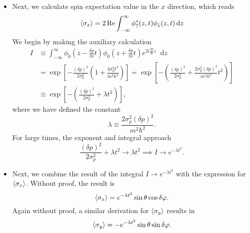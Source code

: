 \documentclass[11pt, a4paper]{article}
\newcommand{\diff}{\mathop{}\!\mathrm{d}} %
\newcommand{\ua}{\uparrow}  %
\newcommand{\da}{\downarrow}  %
\begin{document}
\begin{itemize}
    \item Next, we calculate spin expectation value in the $ x $ direction, which reads
    \begin{equation*}
        \ev{\sigma_{x}} = 2 \Re \int_{-\infty}^{\infty}\phi_{\ua}^{*}(z, t)\phi_{\da}(z, t)\diff z
    \end{equation*}
    We begin by making the auxiliary calculation 
    \begin{align*}
        I & \equiv \int_{-\infty}^{\infty}\phi_{0}\left( z - \frac{\delta p}{m}t \right)\phi_{0}\left( z + \frac{\delta p}{m}t \right)e^{2i \frac{\delta p}{\hbar}z}\diff z\\
        & = \exp \left[ - \frac{(\delta p)^{2}}{2 \sigma_{p}^{2}} \left( 1 + \frac{4 \sigma_{p}^{4}t^{2}}{m^{2}\hbar^{2}} \right) \right]
         = \exp \left[ - \left( \frac{(\delta p)^{2}}{2\sigma_{p}^{2}} + \frac{2 \sigma_{p}^{2} (\delta p)^{2}}{m^{2} \hbar^{2}}t^{2} \right) \right]\\
        &\equiv \exp \left[ - \left( \frac{(\delta p)^{2}}{2\sigma_{p}^{2}} + \lambda t^{2} \right) \right],
    \end{align*}
    where we have defined the constant
    \begin{equation*}
        \lambda \equiv \frac{2 \sigma_{p}^{2}(\delta p)^{2}}{m^{2}\hbar^{2}}.
    \end{equation*}
    For large times, the exponent and integral approach
    \begin{equation*}
        \frac{(\delta p)^{2}}{2\sigma_{p}^{2}} + \lambda t^{2} \to \lambda t^{2} \implies I \to e^{- \lambda t^{2}}.
    \end{equation*}

    \item Next, we combine the result of the integral $ I \to e^{-\lambda t^{2} } $ with the expression for $ \ev{\sigma_{x}} $. Without proof, the result is
    \begin{equation*}
        \ev{\sigma_{x}} = e^{-\lambda t^{2}} \sin \theta \cos \delta \varphi.
    \end{equation*}
    Again without proof, a similar derivation for $ \ev{\sigma_{y}} $ results in
    \begin{equation*}
        \ev{\sigma_{y}} = - e^{-\lambda t^{2}} \sin \theta \sin \delta \varphi.
    \end{equation*}
    
    
\end{itemize}
\end{document}
